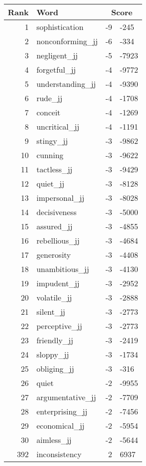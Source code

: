 \begin{longtable}[!htbp]{| rlr@{.}l |}
    \hline
    \textbf{Rank} & \textbf{Word} & \multicolumn{2}{c|}{\textbf{Score}} \\
    \hline
    \endhead
    1 & sophistication & -9 & -245 \\
    2 & nonconforming\_jj & -6 & -334 \\
    3 & negligent\_jj & -5 & -7923 \\
    4 & forgetful\_jj & -4 & -9772 \\
    5 & understanding\_jj & -4 & -9390 \\
    6 & rude\_jj & -4 & -1708 \\
    7 & conceit & -4 & -1269 \\
    8 & uncritical\_jj & -4 & -1191 \\
    9 & stingy\_jj & -3 & -9862 \\
    10 & cunning & -3 & -9622 \\
    11 & tactless\_jj & -3 & -9429 \\
    12 & quiet\_jj & -3 & -8128 \\
    13 & impersonal\_jj & -3 & -8028 \\
    14 & decisiveness & -3 & -5000 \\
    15 & assured\_jj & -3 & -4855 \\
    16 & rebellious\_jj & -3 & -4684 \\
    17 & generosity & -3 & -4408 \\
    18 & unambitious\_jj & -3 & -4130 \\
    19 & impudent\_jj & -3 & -2952 \\
    20 & volatile\_jj & -3 & -2888 \\
    21 & silent\_jj & -3 & -2773 \\
    22 & perceptive\_jj & -3 & -2773 \\
    23 & friendly\_jj & -3 & -2419 \\
    24 & sloppy\_jj & -3 & -1734 \\
    25 & obliging\_jj & -3 & -316 \\
    26 & quiet & -2 & -9955 \\
    27 & argumentative\_jj & -2 & -7709 \\
    28 & enterprising\_jj & -2 & -7456 \\
    29 & economical\_jj & -2 & -5954 \\
    30 & aimless\_jj & -2 & -5644 \\
    392 & inconsistency & 2 & 6937 \\

\end{longtable}
